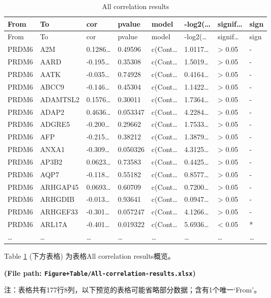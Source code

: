 \documentclass[
]{article}
\begin{document}
\begin{longtable}[]{@{}llllllll@{}}
\caption{\label{tab:All-correlation-results}All correlation results}\tabularnewline
\toprule
From & To & cor & pvalue & model & -log2(\ldots{} & signif\ldots{} & sign\tabularnewline
\midrule
\endfirsthead
\toprule
From & To & cor & pvalue & model & -log2(\ldots{} & signif\ldots{} & sign\tabularnewline
\midrule
\endhead
PRDM6 & A2M & 0.1286\ldots{} & 0.49596 & c(Cont\ldots{} & 1.0117\ldots{} & \textgreater{} 0.05 & -\tabularnewline
PRDM6 & AARD & -0.195\ldots{} & 0.35308 & c(Cont\ldots{} & 1.5019\ldots{} & \textgreater{} 0.05 & -\tabularnewline
PRDM6 & AATK & -0.035\ldots{} & 0.74928 & c(Cont\ldots{} & 0.4164\ldots{} & \textgreater{} 0.05 & -\tabularnewline
PRDM6 & ABCC9 & -0.146\ldots{} & 0.45304 & c(Cont\ldots{} & 1.1422\ldots{} & \textgreater{} 0.05 & -\tabularnewline
PRDM6 & ADAMTSL2 & 0.1576\ldots{} & 0.30011 & c(Cont\ldots{} & 1.7364\ldots{} & \textgreater{} 0.05 & -\tabularnewline
PRDM6 & ADAP2 & 0.4636\ldots{} & 0.053347 & c(Cont\ldots{} & 4.2284\ldots{} & \textgreater{} 0.05 & -\tabularnewline
PRDM6 & ADGRE5 & -0.200\ldots{} & 0.29662 & c(Cont\ldots{} & 1.7533\ldots{} & \textgreater{} 0.05 & -\tabularnewline
PRDM6 & AFP & -0.215\ldots{} & 0.38212 & c(Cont\ldots{} & 1.3879\ldots{} & \textgreater{} 0.05 & -\tabularnewline
PRDM6 & ANXA1 & -0.309\ldots{} & 0.050326 & c(Cont\ldots{} & 4.3125\ldots{} & \textgreater{} 0.05 & -\tabularnewline
PRDM6 & AP3B2 & 0.0623\ldots{} & 0.73583 & c(Cont\ldots{} & 0.4425\ldots{} & \textgreater{} 0.05 & -\tabularnewline
PRDM6 & AQP7 & -0.118\ldots{} & 0.55182 & c(Cont\ldots{} & 0.8577\ldots{} & \textgreater{} 0.05 & -\tabularnewline
PRDM6 & ARHGAP45 & 0.0693\ldots{} & 0.60709 & c(Cont\ldots{} & 0.7200\ldots{} & \textgreater{} 0.05 & -\tabularnewline
PRDM6 & ARHGDIB & -0.013\ldots{} & 0.93641 & c(Cont\ldots{} & 0.0947\ldots{} & \textgreater{} 0.05 & -\tabularnewline
PRDM6 & ARHGEF33 & -0.301\ldots{} & 0.057247 & c(Cont\ldots{} & 4.1266\ldots{} & \textgreater{} 0.05 & -\tabularnewline
PRDM6 & ARL17A & -0.401\ldots{} & 0.019322 & c(Cont\ldots{} & 5.6936\ldots{} & \textless{} 0.05 & *\tabularnewline
\ldots{} & \ldots{} & \ldots{} & \ldots{} & \ldots{} & \ldots{} & \ldots{} & \ldots{}\tabularnewline
\bottomrule
\end{longtable}

Table \ref{tab:All-correlation-results} (下方表格) 为表格All correlation results概览。

\textbf{(File path: \texttt{Figure+Table/All-correlation-results.xlsx})}

\begin{center}\begin{tcolorbox}[colback=gray!10, colframe=gray!50, width=0.9\linewidth, arc=1mm, boxrule=0.5pt]注：表格共有177行8列，以下预览的表格可能省略部分数据；含有1个唯一`From'。
\end{tcolorbox}
\end{center}
\end{document}
